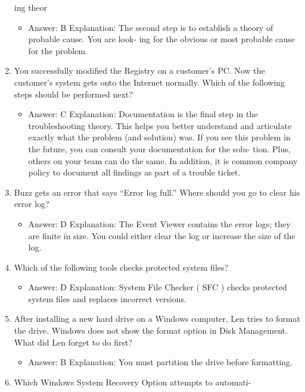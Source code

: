 \documentclass{article}
\begin{document}
\begin{enumerate}
ing theor
     \begin{itemize}
         \item Answer: B
Explanation: The second step is to establish a theory of probable cause. You are look-
ing for the obvious or most probable cause for the problem.
     \end{itemize}
     \item You successfully modified the Registry on a customer’s PC. Now
the customer’s system gets onto the Internet normally. Which of
the following steps should be performed next?
     \begin{itemize}
         \item Answer: C
Explanation: Documentation is the final step in the troubleshooting theory. This helps
you better understand and articulate exactly what the problem (and solution) was. If
you see this problem in the future, you can consult your documentation for the solu-
tion. Plus, others on your team can do the same. In addition, it is common company
policy to document all findings as part of a trouble ticket.
     \end{itemize}
     \item Buzz gets an error that says “Error log full.” Where should you go
to clear his error log?
     \begin{itemize}
         \item Answer: D
Explanation: The Event Viewer contains the error logs; they are finite in size. You could
either clear the log or increase the size of the log.
     \end{itemize}
     \item Which of the following tools checks protected system files?
     \begin{itemize}
         \item Answer: D
Explanation: System File Checker ( SFC ) checks protected system files and replaces
incorrect versions.
     \end{itemize}
     \item After installing a new hard drive on a Windows computer, Len tries
to format the drive. Windows does not show the format option in
Disk Management. What did Len forget to do first?
     \begin{itemize}
         \item Answer: B
Explanation: You must partition the drive before formatting.
     \end{itemize}
     \item Which Windows System Recovery Option attempts to automati-

\end{enumerate}
\end{document}

